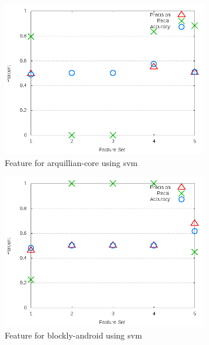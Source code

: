 \begin{figure}
\centering
\includegraphics[width=0.8\textwidth]{images/svm/test_3/arquillian-core_sample_range.png}
\caption{Feature for arquillian-core using \gls{svm}}
\label{fig:test_3_arquillian-core_svm}
\end{figure}

\clearpage

\begin{figure}[!t]
\centering
\includegraphics[width=0.8\textwidth]{images/svm/test_3/blockly-android_sample_range.png}
\caption{Feature for blockly-android using \gls{svm}}
\label{fig:test_3_blockly-android_svm}
\end{figure}

